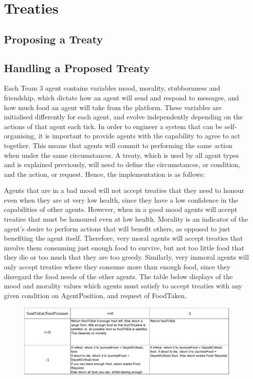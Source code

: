 \section{Treaties}\label{treaties}

\subsection{Proposing a Treaty}

\subsection{Handling a Proposed Treaty}
Each Team 3 agent contains variables mood, morality, stubbornness and friendship, which dictate how an agent will send and respond to messages, and how much food an agent will take from the platform. These variables are initialised differently for each agent, and evolve independently depending on the actions of that agent each tick. In order to engineer a system that can be self-organising, it is important to provide agents with the capability to agree to act together. This means that agents will commit to performing the same action when under the same circumstances. A treaty, which is used by all agent types and is explained previously, will need to define the circumstances, or condition, and the action, or request. Hence, the implementation is as follows: \par
Agents that are in a bad mood will not accept treaties that they need to honour even when they are at very low health, since they have a low confidence in the capabilities of other agents. However, when in a good mood agents will accept treaties that must be honoured even at low health. Morality is an indicator of the agent’s desire to perform actions that will benefit others, as opposed to just benefiting the agent itself. Therefore, very moral agents will accept treaties that involve them consuming just enough food to survive, but not too little food that they die or too much that they are too greedy. Similarly, very immoral agents will only accept treaties where they consume more than enough food, since they disregard the food needs of the other agents. The table below displays of the mood and morality values which agents must satisfy to accept treaties with any given condition on AgentPosition, and request of FoodTaken.\par
\begin{figure}[htb]
    \centering
    \includegraphics[width=1\linewidth]{005_team_3_agent_design/images/table1.jpg}
\end{figure}
